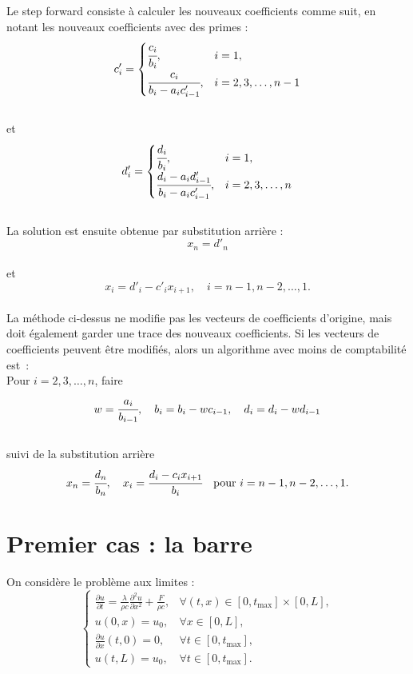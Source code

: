 \documentclass{article}
\begin{document}
Le step forward consiste à calculer les nouveaux coefficients comme suit, en notant les nouveaux coefficients avec des primes :\\
\[
c'_i =
\begin{cases}
\cfrac{c_i}{b_i}, & i=1, \\
\cfrac{c_i}{b_i - a_i c'_{i-1}}, & i=2,3,\dots,n-1
\end{cases}
\]
\\et\\
\[
d'_i =
\begin{cases}
\cfrac{d_i}{b_i}, & i=1, \\
\cfrac{d_i - a_i d'_{i-1}}{b_i - a_i c'_{i-1}}, & i=2,3,\dots,n
\end{cases}
\]
\\La solution est ensuite obtenue par substitution arrière :\\
\[
x_n = d'_n
\]
\\et\\
\[
x_i = d'_i - c'_i x_{i+1}, \quad i=n-1,n-2,\ldots,1.
\]
\\La méthode ci-dessus ne modifie pas les vecteurs de coefficients d'origine, mais doit également garder une trace des nouveaux coefficients. Si les vecteurs de coefficients peuvent être modifiés, alors un algorithme avec moins de comptabilité est :\\Pour \(i = 2,3,\dots,n\), faire\\
\[
w = \cfrac{a_i}{b_{i-1}}, \quad b_i = b_i - wc_{i-1}, \quad d_i = d_i - wd_{i-1}
\]
\\suivi de la substitution arrière\\
\[
x_n = \cfrac{d_n}{b_n}, \quad x_i = \cfrac{d_i - c_i x_{i+1}}{b_i} \quad \text{pour } i=n-1,n-2,\dots,1.
\]


\newpage

\section{Premier cas : la barre}

On considère le problème aux limites :\\
\begin{equation}
\begin{cases}
    \frac{\partial u}{\partial t} = \frac{\lambda}{\rho c} \frac{\partial^2 u}{\partial x^2} + \frac{F}{\rho c}, & \forall (t, x) \in [0, t_{\text{max}}] \times [0, L], \\
    u(0, x) = u_0, & \forall x \in [0, L], \\
    \frac{\partial u}{\partial x}(t, 0) = 0, & \forall t \in [0, t_{\text{max}}], \\
    u(t, L) = u_0, & \forall t \in [0, t_{\text{max}}].
\end{cases}
\end{equation}
\end{document}

